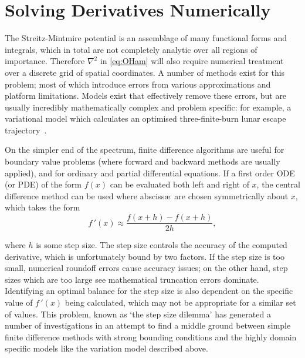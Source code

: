 \section{Solving Derivatives Numerically}\label{sec:numder}
The Streitz-Mintmire potential \cite{Streitz1994} is an assemblage of many functional forms and integrals, which in total are not completely analytic over all regions of importance.
Therefore $\nabla^2$ in \cref{eq:OHam} will also require numerical treatment over a discrete grid of spatial coordinates.
A number of methods exist for this problem; most of which introduce errors from various approximations and platform limitations.
Models exist that effectively remove these errors, but are usually incredibly mathematically complex and problem specific: for example, a variational model which calculates an optimised three-finite-burn lunar escape trajectory~\cite{Ocampo2012}.

On the simpler end of the spectrum, finite difference algorithms are useful for boundary value problems (where forward and backward methods are usually applied), and for ordinary and partial differential equations.
If a first order ODE (or PDE) of the form $f(x)$ can be evaluated both left and right of $x$, the central difference method can be used where absciss\ae\ are chosen symmetrically about $x$, which takes the form
\begin{equation}
f\,'(x) \approx \frac{f(x+h)-f(x+h)}{2h},\label{eq:simplecdiff}
\end{equation}

where $h$ is some step size.
The step size controls the accuracy of the computed derivative, which is unfortunately bound by two factors.
If the step size is too small, numerical roundoff errors cause accuracy issues; on the other hand, step sizes which are too large see mathematical truncation errors dominate.
Identifying an optimal balance for the step size is also dependent on the specific value of $f\,'(x)$ being calculated, which may not be appropriate for a similar set of values.
This problem, known as `the step size dilemma' has generated a number of investigations in an attempt to find a middle ground between simple finite difference methods with strong bounding conditions and the highly domain specific models like the variation model described above.

